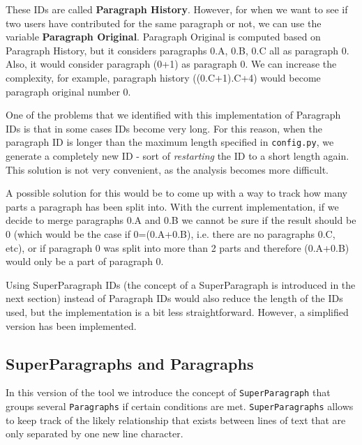     These IDs are called \textbf{Paragraph History}. However, for when we want to see if two users have contributed for the same paragraph or not, we can use the variable \textbf{Paragraph Original}. Paragraph Original is computed based on Paragraph History, but it considers paragraphs 0.A, 0.B, 0.C all as paragraph 0. Also, it would consider paragraph (0+1) as paragraph 0. We can increase the complexity, for example, paragraph history ((0.C+1).C+4) would become paragraph original number 0. 

    One of the problems that we identified with this implementation of Paragraph IDs is that in some cases IDs become very long. For this reason, when the paragraph ID is longer than the maximum length specified in \texttt{config.py}, we generate a completely new ID - sort of \textit{restarting} the ID to a short length again. This solution is not very convenient, as the analysis becomes more difficult.
    
    A possible solution for this would be to come up with a way to track how many parts a paragraph has been split into. With the current implementation, if we decide to merge paragraphs 0.A and 0.B we cannot be sure if the result should be 0 (which would be the case if 0=(0.A+0.B), i.e. there are no paragraphs 0.C, etc), or if paragraph 0 was split into more than 2 parts and therefore (0.A+0.B) would only be a part of paragraph 0.
    
    Using SuperParagraph IDs (the concept of a SuperParagraph is introduced in the next section)  instead of Paragraph IDs would also reduce the length of the IDs used, but the implementation is a bit less straightforward. However, a simplified version has been implemented.

  \subsection{{SuperParagraphs} and {Paragraphs}}
    \label{sub:superparas}
    In this version of the tool we introduce the concept of \texttt{SuperParagraph} that groups several \texttt{Paragraphs} if certain conditions are met. \texttt{SuperParagraphs} allows to keep track of the likely relationship that exists between lines of text that are only separated by one new line character.
    
